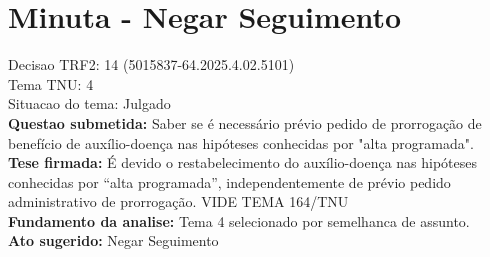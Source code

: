\documentclass{article}
\begin{document}
\section*{Minuta - Negar Seguimento}
Decisao TRF2: 14 (5015837-64.2025.4.02.5101)\\
Tema TNU: 4\\
Situacao do tema: Julgado\\
\textbf{Questao submetida:} Saber se é necessário prévio pedido de prorrogação de benefício de auxílio-doença nas hipóteses conhecidas por "alta programada".\\
\textbf{Tese firmada:} É devido o restabelecimento do auxílio-doença nas hipóteses conhecidas por “alta programada”, independentemente de prévio pedido administrativo de prorrogação. VIDE TEMA 164/TNU\\
\textbf{Fundamento da analise:} Tema 4 selecionado por semelhanca de assunto.\\
\textbf{Ato sugerido:} Negar Seguimento
\end{document}
